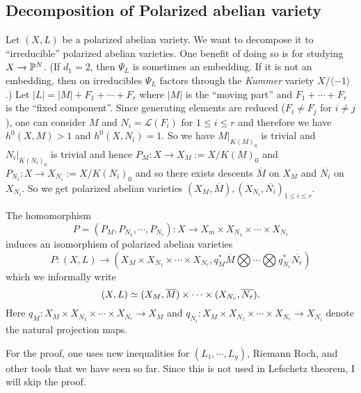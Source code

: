 \subsection{Decomposition of Polarized abelian variety}
Let $(X,L)$ be a polarized abelian variety. We want to decompose it to ``irreducible'' polarized abelian varieties. One benefit of doing so is for studying $X\to {\mathbb P}^N$. (If $d_1=2$, then $\Psi_L$ is sometimes an embedding. If it is not an embedding, then on irreducibles $\Psi_L$ factors through the \emph{Kummer} variety $X/\langle -1\rangle$.) Let $|L|=|M|+F_1+\cdots+F_r$ where $|M|$ is the ``moving part'' and $F_1+\cdots+F_r$ is the ``fixed component''. Since generating elements are reduced ($F_i\not=F_j$ for $i\not=j$), one can consider $M$ and $N_i=\mathcal{L}(F_i)$ for $1\leq i\leq r$ and therefore we have $h^0(X,M)>1$ and $h^0(X,N_i)=1$. So we have $M|_{K(M)_0}$ is trivial and $N_i|_{K(N_i)_0}$ is trivial and hence $P_M:X\to X_M:=X/K(M)_0$ and $P_{N_i}:X\to X_{N_i}:=X/K(N_i)_0$ and so there exists descents $\overline{M}$ on $X_M$ and $\overline{N_i}$ on $X_{N_i}$. So we get polarized abelian varieties $(X_M,\overline{M}),(X_{N_i},\overline{N_i})_{1\leq i \leq r}$. 

\begin{theorem}
The homomorphism 
$$P=(P_M,P_{N_1},\cdots,P_{N_r}):X\to X_m\times X_{N_1}\times\cdots \times X_{N_r}$$
induces an isomorphism of polarized abelian varieties
$$P:(X,L)\to (X_M\times X_{N_1}\times \cdots \times X_{N_r}, q_M^* \overline{M}\bigotimes \cdots \bigotimes q_{N_r}^* \overline{N_r})$$
which we informally write 
$$(X,L)\simeq (X_M,\overline{M})\times \cdots \times (X_{N_r},\overline{N_r}).$$
Here $q_M: X_M\times X_{N_1}\times \cdots \times X_{N_r} \rightarrow X_M$ and $q_{N_i}: X_{M}\times X_{N_1}\times \cdots \times X_{N_r} \rightarrow X_{N_i}$ denote the natural projection maps.
\end{theorem}

For the proof, one uses new inequalities for $(L_1,\cdots, L_g)$, Riemann Roch, and other tools that we have seen so far. Since this is not used in Lefschetz theorem, I will skip the proof.